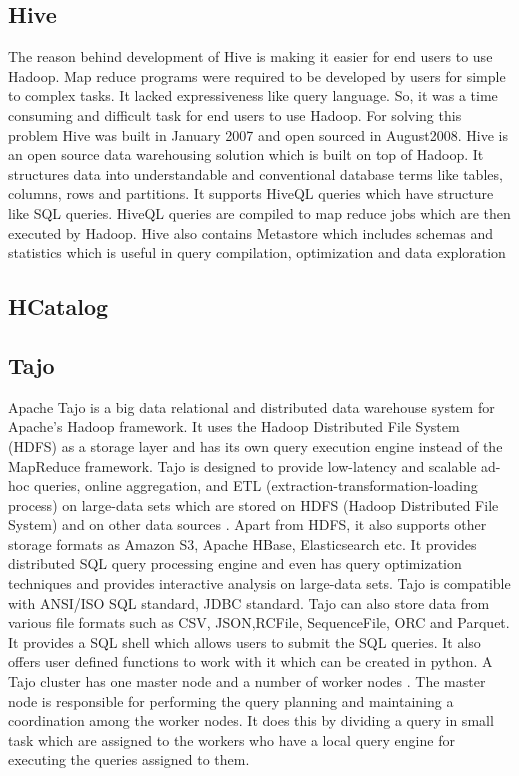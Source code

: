 \subsection{Hive}
     
     The reason behind development of Hive is making it easier for end
     users to use Hadoop. Map reduce programs were required to be
     developed by users for simple to complex tasks. It lacked
     expressiveness like query language. So, it was a time consuming
     and difficult task for end users to use Hadoop. For solving this
     problem Hive was built in January 2007 and open sourced in
     August2008.  Hive is an open source data warehousing solution
     which is built on top of Hadoop. It structures data into
     understandable and conventional database terms like tables,
     columns, rows and partitions. It supports HiveQL queries which
     have structure like SQL queries. HiveQL queries are compiled to
     map reduce jobs which are then executed by Hadoop.  Hive also
     contains Metastore which includes schemas and statistics which is
     useful in query compilation, optimization and data exploration
     \cite{www-hive}

\subsection{HCatalog}
\subsection{Tajo}

     Apache Tajo \cite{www-apache-tajo} is a big data relational and
     distributed data warehouse system for Apache's Hadoop
     framework. It uses the Hadoop Distributed File System (HDFS) as a
     storage layer and has its own query execution engine instead of
     the MapReduce framework. Tajo is designed to provide low-latency
     and scalable ad-hoc queries, online aggregation, and ETL
     (extraction-transformation-loading process) on large-data sets
     which are stored on HDFS (Hadoop Distributed File System) and on
     other data sources \cite{www-tutorialspoint-tajo}. Apart from HDFS,
     it also supports other storage formats as Amazon S3, Apache
     HBase, Elasticsearch etc. It provides distributed SQL query
     processing engine and even has query optimization techniques and
     provides interactive analysis on large-data sets. Tajo is
     compatible with ANSI/ISO SQL standard, JDBC standard. Tajo can
     also store data from various file formats such as CSV,
     JSON,RCFile, SequenceFile, ORC and Parquet. It provides a SQL
     shell which allows users to submit the SQL queries. It also
     offers user defined functions to work with it which can be
     created in python. A Tajo cluster has one master node and a
     number of worker nodes \cite{www-tutorialspoint-tajo}. The master
     node is responsible for performing the query planning and
     maintaining a coordination among the worker nodes. It does this
     by dividing a query in small task which are assigned to the
     workers who have a local query engine for executing the queries
     assigned to them.
     

